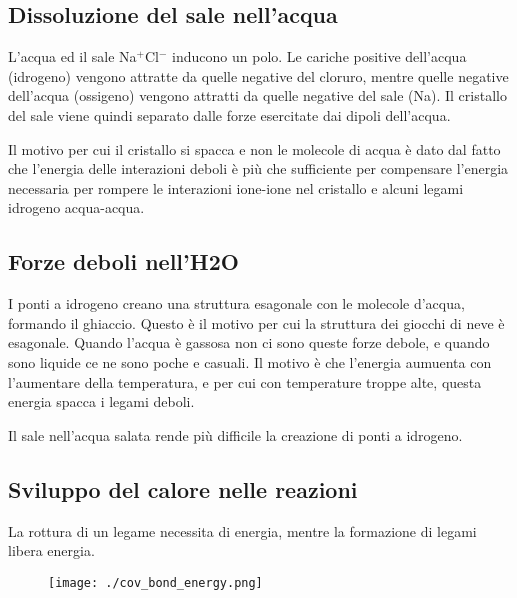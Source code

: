 \documentclass[a4paper]{article}
\begin{document}
\subsection{Dissoluzione del sale nell'acqua}

L'acqua ed il sale Na\(^{+}\)Cl\(^{-}\) inducono un polo.
Le cariche positive dell'acqua (idrogeno) vengono attratte da quelle negative
del cloruro, mentre quelle negative dell'acqua (ossigeno)
vengono attratti da quelle negative del sale (Na).
Il cristallo del sale viene quindi separato dalle forze
esercitate dai dipoli dell'acqua.

Il motivo per cui il cristallo si spacca e non le molecole di acqua
è dato dal fatto che l'energia delle interazioni deboli è più che sufficiente
per compensare l'energia necessaria per rompere le interazioni ione-ione
nel cristallo e alcuni legami idrogeno acqua-acqua.

\subsection{Forze deboli nell'H2O}

I ponti a idrogeno creano una struttura esagonale con le molecole d'acqua,
formando il ghiaccio.
Questo è il motivo per cui la struttura dei giocchi di neve è esagonale.
Quando l'acqua è gassosa non ci sono queste forze debole, e quando sono
liquide ce ne sono poche e casuali.
Il motivo è che l'energia aumuenta con l'aumentare della temperatura,
e per cui con temperature troppe alte, questa energia spacca i legami deboli.

Il sale nell'acqua salata rende più difficile la creazione di ponti a idrogeno.


\pagebreak

\subsection{Sviluppo del calore nelle reazioni}

La rottura di un legame necessita di energia, mentre
la formazione di legami libera energia.

\begin{center}
\begin{figure}[h]
    \centering
    \texttt{[image: ./cov\_bond\_energy.png]}
\end{figure}
\end{center}
\end{document}
